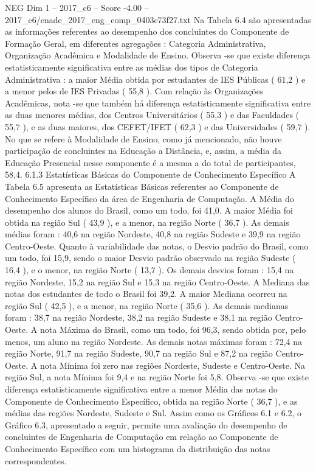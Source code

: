 \begin{textsample}{NEG Dim 1 – 2017\_c6 – Score -4.00 – 2017\_c6/enade\_2017\_eng\_comp\_0403c73f27.txt}
Na Tabela 6.4 são apresentadas as informações referentes ao desempenho dos concluintes do Componente de Formação Geral, em diferentes agregações : Categoria Administrativa, Organização Acadêmica e Modalidade de Ensino.
Observa -se que existe diferença estatisticamente significativa entre as médias dos tipos de Categoria Administrativa : a maior Média obtida por estudantes de IES Públicas ( 61,2 ) e a menor pelos de IES Privadas ( 55,8 ).
Com relação às Organizações Acadêmicas, nota -se que também há diferença estatisticamente significativa entre as duas menores médias, dos Centros Universitários ( 55,3 ) e das Faculdades ( 55,7 ), e as duas maiores, dos CEFET/IFET ( 62,3 ) e das Universidades ( 59,7 ).
No que se refere à Modalidade de Ensino, como já mencionado, não houve participação de concluintes na Educação a Distância, e, assim, a média da Educação Presencial nesse componente é a mesma a do total de participantes, 58,4. 6.1.3 Estatísticas Básicas do Componente de Conhecimento Específico A Tabela 6.5 apresenta as Estatísticas Básicas referentes ao Componente de Conhecimento Específico da área de Engenharia de Computação.
A Média do desempenho dos alunos do Brasil, como um todo, foi 41,0.
A maior Média foi obtida na região Sul ( 43,9 ), e a menor, na região Norte ( 36,7 ).
As demais médias foram : 40,6 na região Nordeste, 40,8 na região Sudeste e 39,9 na região Centro-Oeste.
Quanto à variabilidade das notas, o Desvio padrão do Brasil, como um todo, foi 15,9, sendo o maior Desvio padrão observado na região Sudeste ( 16,4 ), e o menor, na região Norte ( 13,7 ).
Os demais desvios foram : 15,4 na região Nordeste, 15,2 na região Sul e 15,3 na região Centro-Oeste.
A Mediana das notas dos estudantes de todo o Brasil foi 39,2.
A maior Mediana ocorreu na região Sul ( 42,5 ), e a menor, na região Norte ( 35,6 ).
As demais medianas foram : 38,7 na região Nordeste, 38,2 na região Sudeste e 38,1 na região Centro-Oeste.
A nota Máxima do Brasil, como um todo, foi 96,3, sendo obtida por, pelo menos, um aluno na região Nordeste.
As demais notas máximas foram : 72,4 na região Norte, 91,7 na região Sudeste, 90,7 na região Sul e 87,2 na região Centro-Oeste.
A nota Mínima foi zero nas regiões Nordeste, Sudeste e Centro-Oeste.
Na região Sul, a nota Mínima foi 9,4 e na região Norte foi 5,8.
Observa -se que existe diferença estatisticamente significativa entre a menor Média das notas do Componente de Conhecimento Específico, obtida na região Norte ( 36,7 ), e as médias das regiões Nordeste, Sudeste e Sul.
Assim como os Gráficos 6.1 e 6.2, o Gráfico 6.3, apresentado a seguir, permite uma avaliação do desempenho de concluintes de Engenharia de Computação em relação ao Componente de Conhecimento Específico com um histograma da distribuição das notas correspondentes.

\end{textsample}
